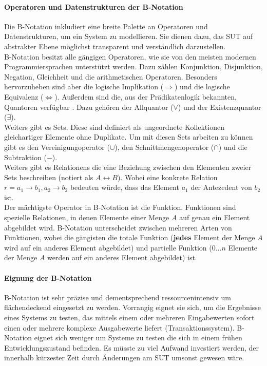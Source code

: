 \paragraph{Operatoren und Datenstrukturen der B-Notation}
Die B-Notation inkludiert eine breite Palette an Operatoren und Datenstrukturen, um ein System zu modellieren. Sie dienen dazu, das \gls{SUT} auf abstrakter Ebene möglichst transparent und verständlich darzustellen.\\
B-Notation besitzt alle gängigen Operatoren, wie sie von den meisten modernen Programmiersprachen unterstützt werden. Dazu zählen Konjunktion, Disjunktion, Negation, Gleichheit und die arithmetischen Operatoren. Besonders hervorzuheben sind aber die logische Implikation ($\Rightarrow$) und die logische Equivalenz ($\Leftrightarrow$). Außerdem sind die, aus der Prädikatenlogik bekannten, Quantoren verfügbar \cite{teschl_mathematik_2013}. Dazu gehören der Allquantor ($\forall$) und der Existenzquantor ($\exists$).\\
Weiters gibt es Sets. Diese sind definiert als ungeordnete Kollektionen gleichartiger Elemente ohne Duplikate. Um mit diesen Sets arbeiten zu können gibt es den Vereinigungoperator ($\cup$), den Schnittmengenoperator ($\cap$) und die Subtraktion ($-$).\\
Weiters gibt es Relationens die eine Beziehung zwischen den Elementen zweier Sets beschreiben (notiert als $A \leftrightarrow B$). Wobei eine konkrete Relation $r = {a_1 \rightarrow b_1, a_2 \rightarrow b_2} $ bedeuten würde, dass das Element $a_1$ der Antezedent von $b_2$ ist.\\
Der mächtigste Operator in B-Notation ist die Funktion. Funktionen sind spezielle Relationen, in denen Elemente einer Menge $A$ auf genau ein Element abgebildet wird. B-Notation unterscheidet zwischen mehreren Arten von Funktionen, wobei die gängisten die totale Funktion (\textbf{jedes} Element der Menge $A$ wird auf ein anderes Element abgebildet) und partielle Funktion ($0...n$ Elemente der Menge $A$ werden auf ein anderes Element abgebildet) ist. 

\paragraph{Eignung der B-Notation}
B-Notation ist sehr präzise und dementsprechend ressourcenintensiv um flächendeckend eingesetzt zu werden. Vorrangig eignet sie sich, um die Ergebnisse eines Systems zu testen, das mittels einem oder mehreren Eingabewerten sofort einen oder mehrere komplexe Ausgabewerte liefert (Transaktionssystem). B-Notation eignet sich weniger um Systeme zu testen die sich in einem frühen Entwicklungszustand befinden. Es müsste zu viel Aufwand investiert werden, der innerhalb kürzester Zeit durch Änderungen am \Gls{SUT} umsonst gewesen wäre.

